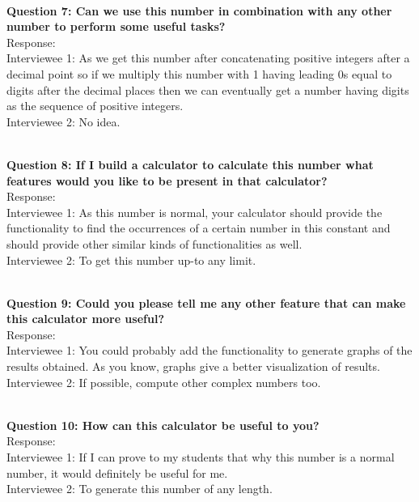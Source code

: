 \documentclass[paper=a4, fontsize=11pt]{scrartcl}
\numberwithin{equation}{section}		%
\numberwithin{figure}{section}			%
\numberwithin{table}{section}				%
\begin{document}
\begin{flushleft}
\setlength{\parskip}{\baselineskip}
\hrulefill
\\\textbf{Question 7: Can we use this number in combination with any other number to perform some useful tasks?}
\\Response:
\\Interviewee 1: As we get this number after concatenating positive integers after a decimal point  so if we multiply this number with 1 having leading 0s equal to digits after the decimal places then 
we can eventually get a number having digits as the sequence of positive integers.
\\Interviewee 2: No idea.
\end{flushleft}

\begin{flushleft}
\setlength{\parskip}{\baselineskip}
\hrulefill
\\\textbf{Question 8: If I build a calculator to calculate this number what features would you like to be present in that calculator?}
\\Response:
\\Interviewee 1: As this number is normal, your calculator should provide the functionality to find the occurrences of a certain number in this constant and should provide other similar kinds of functionalities as well.
\\Interviewee 2: To get this number up-to any limit.
\end{flushleft}

\begin{flushleft}
\setlength{\parskip}{\baselineskip}
\hrulefill
\\\textbf{Question 9: Could you please tell me any other feature that can make this calculator more useful?}
\\Response:
\\Interviewee 1: You could probably add the functionality to generate graphs of the results obtained. As you know, graphs give a better visualization of results.
\\Interviewee 2: If possible, compute other complex numbers too.
\end{flushleft}

\begin{flushleft}
\setlength{\parskip}{\baselineskip}
\hrulefill
\\\textbf{Question 10: How can this calculator be useful to you?}
\\Response:
\\Interviewee 1: If I can prove to my students that why this number is a normal number, it would definitely be useful for me.
\\Interviewee 2: To generate this number of any length.
\end{flushleft}
\end{document}

